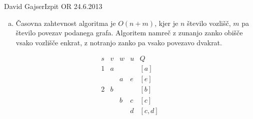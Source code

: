 \begin{naloga}{David Gajser}{Izpit OR 24.6.2013}
\begin{odgovor}
\begin{enumerate}[(a)]
\needspace{\baselineskip}
\item Časovna zahtevnost algoritma je $O(n + m)$,
kjer je $n$ število vozlišč, $m$ pa število povezav podanega grafa.
Algoritem namreč z zunanjo zanko obišče vsako vozlišče enkrat,
z notranjo zanko pa vsako povezavo dvakrat.
\end{enumerate}
%
\begin{tabela}
$$
\begin{array}{ccccl}
s & v & w & u & Q \\ \hline
1 & a &   &   & [a] \\
  &   & a & e & [e] \\
2 & b &   &   & [b] \\
  &   & b & c & [c] \\
  &   &   & d & [c, d]
\end{array}
$$
\end{tabela}
\end{odgovor}
\end{naloga}
